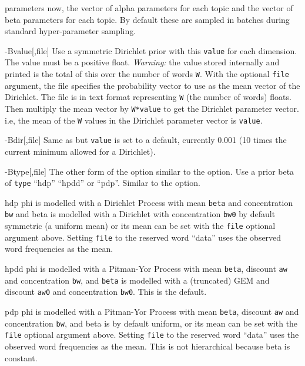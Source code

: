\documentclass[a4paper,english]{article}
\begin{document}
\begin{Description}
\begin{Description}[hpdd]
parameters now, the vector of alpha parameters for each topic and the
vector of beta parameters for each topic.
By default these are sampled in batches 
during standard hyper-parameter sampling.
\end{Description}
\item[{-B}{value[,file]}]  Use a symmetric Dirichlet prior with
this \texttt{value} for each dimension.
The value must be a positive float.
\emph{Warning:}
 the value stored internally and printed is the total of this over the
number of words \texttt{W}.
With the optional \texttt{file} argument, the file
specifies the probability vector to use as the mean vector of the
Dirichlet. The file is in text format representing  \texttt{W} 
(the number of words) floats.
Then multiply the mean vector by \texttt{W*value} 
to get the Dirichlet parameter vector.
i.e, the mean of the \texttt{W} values 
in the Dirichlet parameter vector is \texttt{value}.
\item[{-B}{dir[,file]}]  Same as  but
\texttt{value} is set to a default, currently 0.001
(10 times the current minimum allowed for a Dirichlet).
\item[{-B}{type[,file]}] 
The other form of the  option
similar to the  option.
Use a prior beta of \texttt{type}
``hdp'' ``hpdd'' or ``pdp''.  Similar to the  option.
\begin{Description}[hpdd]
\item[hdp] phi is modelled with a Dirichlet Process
with mean \texttt{beta} and concentration \texttt{bw} and 
beta is modelled with a Dirichlet with concentration \texttt{bw0}
by default symmetric (a uniform mean)
or its mean can be set with the \texttt{file} optional argument above.
Setting \texttt{file} to the reserved word ``data''
uses the observed word frequencies as the mean.
\item[hpdd] 
phi is modelled with a Pitman-Yor Process
with mean \texttt{beta}, discount \texttt{aw} and concentration \texttt{bw},
and \texttt{beta} is modelled with a (truncated) GEM 
and discount \texttt{aw0} and concentration \texttt{bw0}.
This is the default.
\item[pdp]
 phi is modelled with a Pitman-Yor Process
with mean \texttt{beta}, discount \texttt{aw} and concentration \texttt{bw},
and beta is by default uniform,
or its mean can be set with the \texttt{file} optional argument above.
Setting \texttt{file} to the reserved word ``data''
uses the observed word frequencies as the mean.
This is not hierarchical because beta is constant.

\end{Description}
\end{Description}
\end{document}
